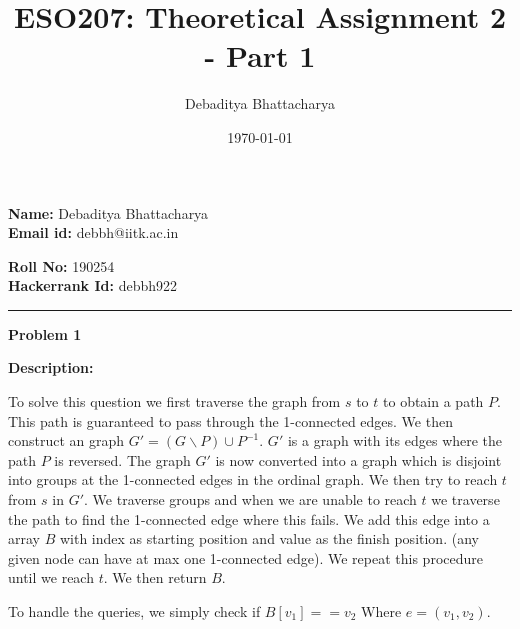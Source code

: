 \documentclass[10pt, a4paper]{article}
\title{ESO207: Theoretical Assignment 2 - Part 1}
\author{Debaditya Bhattacharya}
\date{\today}
\begin{document}
\maketitle

\noindent\begin{minipage}{2in}
    \textbf{Name: }Debaditya Bhattacharya \\
    \textbf{Email id: }debbh@iitk.ac.in  
\end{minipage}
\hfill
\noindent\begin{minipage}{1.7in}
    \textbf{Roll No: }190254\\
    \textbf{Hackerrank Id: }debbh922
\end{minipage}
\parskip 0.3cm
\parindent 0cm
\rule{\textwidth}{1px}

\large{\textbf{Problem 1}}
\normalsize

\textbf{Description:}

To solve this question we first traverse the graph from $s$ to $t$ to obtain a path $P$. This path is guaranteed to pass through the 1-connected edges. We then construct an graph $G' = (G\backslash P)\cup P^{-1}$. $G'$ is a graph with its edges where the path $P$ is reversed. The graph $G'$ is now converted into a graph which is disjoint into groups at the 1-connected edges in the ordinal graph. We then try to reach $t$ from $s$ in $G'$. We traverse groups and when we are unable to reach $t$ we traverse the path to find the 1-connected edge where this fails. We add this edge into a array $B$ with index as starting position and value as the finish position. (any given node can have at max one 1-connected edge). We repeat this procedure until we reach $t$. We then return $B$. 

To handle the queries, we simply check if $B[v_1] == v_2$ Where $e = (v_1,v_2)$.
\end{document}
